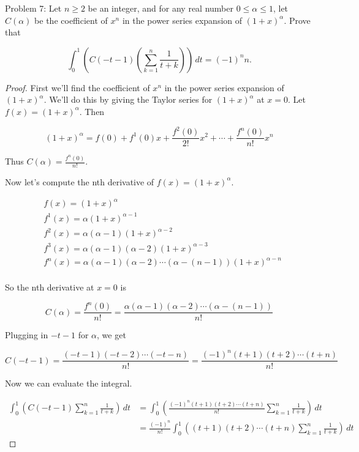 \usepackage{amsthm}

Problem 7: Let $n \ge 2$ be an integer, and for any real number $0 \le \alpha \le 1$, let $C(\alpha)$ be the coefficient of $x^n$ in the power series expansion of $(1+x)^\alpha$. Prove that

\[\int_0^1 \left(C(-t-1)\left(\sum_{k=1}^n \frac{1}{t+k}\right)\right)\,dt = (-1)^n n. \]

\begin{proof}
First we'll find the coefficient of $x^n$ in the power series expansion of $(1 + x)^\alpha$. We'll do this by giving the Taylor series for $(1 + x)^\alpha$ at $x = 0$. Let $f(x) = (1 + x)^\alpha$. Then

\[ 
(1 + x)^\alpha = f(0) + f^1(0)x + \frac{f^2(0)}{2!}x^2 + \cdots + \frac{f^n(0)}{n!}x^n 
\]

Thus $\displaystyle C(\alpha) = \frac{f^n(0)}{n!}$.

Now let's compute the nth derivative of $f(x) = (1 + x)^\alpha$.

\begin{align*}
& f(x) = (1 + x)^\alpha \\
& f^1(x) = \alpha(1 + x)^{\alpha - 1} \\
& f^2(x) = \alpha(\alpha - 1)(1 + x)^{\alpha - 2} \\
& f^3(x) = \alpha(\alpha - 1)(\alpha - 2)(1 + x)^{\alpha - 3} \\
& f^n(x) = \alpha(\alpha - 1)(\alpha - 2)\cdots(\alpha - (n-1))(1 + x)^{\alpha - n} \\
\end{align*}

So the nth derivative at $x = 0$ is

\[ C(\alpha) = \frac{f^n(0)}{n!} = \frac{\alpha(\alpha - 1)(\alpha - 2)\cdots(\alpha - (n-1))}{n!} \]

Plugging in $-t - 1$ for $\alpha$, we get

\[ C(-t - 1) = \frac{(-t - 1)(-t - 2)\cdots(-t - n)}{n!} = \frac{(-1)^n (t + 1)(t + 2)\cdots(t + n)}{n!} \]

Now we can evaluate the integral.

\begin{align*}
\int_0^1 \left(C(-t - 1) \sum_{k=1}^{n} \frac{1}{t + k} \right) \, dt 
&= \int_0^1 \left( \frac{(-1)^n (t + 1)(t + 2)\cdots(t + n)}{n!} \sum_{k=1}^{n} \frac{1}{t + k} \right) \, dt \\
&= \frac{(-1)^n}{n!} \int_0^1 \left( (t + 1)(t + 2)\cdots(t + n) \sum_{k=1}^{n} \frac{1}{t + k} \right) \, dt
\end{align*}


\end{proof}
